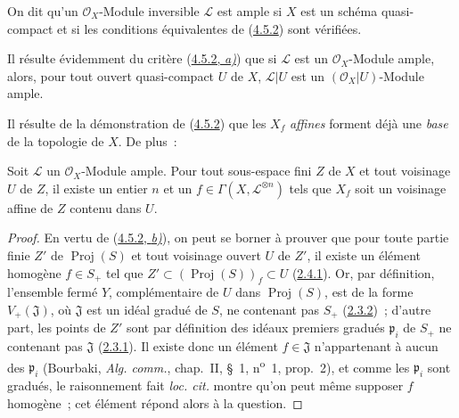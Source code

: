 \begin{definition}[4.5.3]
\label{II.4.5.3-fr}
On dit qu'un $\mathcal{O}_X$-Module inversible $\mathcal{L}$ est \textup{ample} si
$X$ est un schéma quasi-compact et si les conditions équivalentes de
\textup{(\hyperref[II.4.5.2-fr]{4.5.2})} sont vérifiées.
\end{definition}

Il résulte évidemment du critère (\hyperref[II.4.5.2-fr]{4.5.2, \emph{a)}}) que si
$\mathcal{L}$ est un $\mathcal{O}_X$-Module ample, alors, pour tout ouvert quasi-compact
$U$ de $X$, $\mathcal{L}|U$ est un $(\mathcal{O}_X|U)$-Module ample.

Il résulte de la démonstration de (\hyperref[II.4.5.2-fr]{4.5.2}) que les
$X_f$ \emph{affines} forment déjà une \emph{base} de la topologie de $X$. De plus~:

\begin{corollary}[4.5.4]
\label{II.4.5.4-fr}
Soit $\mathcal{L}$ un $\mathcal{O}_X$-Module ample. Pour tout sous-espace fini
$Z$ de $X$ et tout voisinage $U$ de $Z$, il existe un entier $n$ et un
$f\in\Gamma(X,\mathcal{L}^{\otimes n})$ tels que $X_f$ soit un voisinage
affine de $Z$ contenu dans $U$.
\end{corollary}

\begin{proof}

En vertu de (\hyperref[II.4.5.2-fr]{4.5.2, \emph{b)}}), on peut se borner à prouver
que pour toute partie finie $Z'$ de $\operatorname{Proj}(S)$ et tout
voisinage ouvert $U$ de $Z'$, il existe un élément homogène $f\in S_+$ tel
que $Z'\subset(\operatorname{Proj}(S))_f\subset U$
(\hyperref[II.2.4.1-fr]{2.4.1}). Or, par définition, l'ensemble fermé $Y$,
complémentaire de $U$ dans $\operatorname{Proj}(S)$, est de la forme
$V_+(\mathfrak{J})$, où $\mathfrak{J}$ est un idéal gradué de $S$, ne
contenant pas $S_+$ (\hyperref[II.2.3.2-fr]{2.3.2})~; d'autre part, les
points de $Z'$ sont par définition des idéaux premiers gradués
$\mathfrak{p}_i$ de $S_+$ ne contenant pas $\mathfrak{J}$
(\hyperref[II.2.3.1-fr]{2.3.1}). Il existe donc un élément
$f\in\mathfrak{J}$ n'appartenant à aucun des $\mathfrak{p}_i$ (Bourbaki,
\emph{Alg. comm.}, chap.~II, \S~1, n\textsuperscript{o}~1, prop.~2), et comme
les $\mathfrak{p}_i$ sont gradués, le raisonnement fait \emph{loc. cit.}
montre qu'on peut même supposer $f$ homogène~; cet élément répond alors à la
question.
\end{proof}


